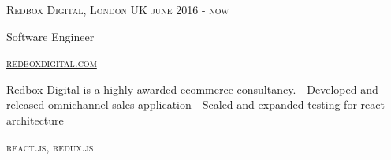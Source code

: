 {
  \textsc{\small{Redbox Digital, London UK
    \hfill
      {\raggedleft
        june 2016 - now
      } \\
    }
  }
  {\raggedright\large {
      Software Engineer
  }}

  \textsc{\small\href{http://www.redboxdigital.com}{redboxdigital.com}}

  \normalsize{\raggedright
    Redbox Digital is a highly awarded ecommerce consultancy.
    - Developed and released omnichannel sales application
    - Scaled and expanded testing for react architecture
  }

  \textsc{\small{\color{highlight}
    react.js,
    redux.js
  }}
}

